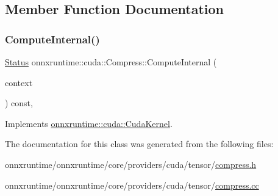 \subsection{Member Function Documentation}
\mbox{\label{classonnxruntime_1_1cuda_1_1Compress_a62be749627510678c38e907dca88cbd1}} 
\subsubsection{\texorpdfstring{Compute\+Internal()}{ComputeInternal()}}
{\footnotesize\ttfamily \mbox{\hyperlink{classonnxruntime_1_1common_1_1Status}{Status}} onnxruntime\+::cuda\+::\+Compress\+::\+Compute\+Internal (\begin{DoxyParamCaption}\item[{\mbox{\hyperlink{classonnxruntime_1_1OpKernelContext}{Op\+Kernel\+Context}} $\ast$}]{context }\end{DoxyParamCaption}) const\hspace{0.3cm}{\ttfamily [override]}, {\ttfamily [virtual]}}



Implements \mbox{\hyperlink{classonnxruntime_1_1cuda_1_1CudaKernel_aca7af04ae448017d6023d30bba231ebb}{onnxruntime\+::cuda\+::\+Cuda\+Kernel}}.



The documentation for this class was generated from the following files\+:\begin{DoxyCompactItemize}
\item 
onnxruntime/onnxruntime/core/providers/cuda/tensor/\mbox{\hyperlink{cuda_2tensor_2compress_8h}{compress.\+h}}\item 
onnxruntime/onnxruntime/core/providers/cuda/tensor/\mbox{\hyperlink{cuda_2tensor_2compress_8cc}{compress.\+cc}}\end{DoxyCompactItemize}
